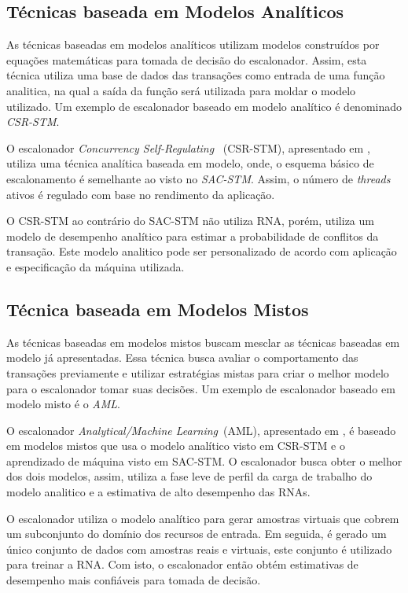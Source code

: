 \documentclass[ti]{texufpel}
\begin{document}
\subsection{Técnicas baseada em Modelos Analíticos}

As técnicas baseadas em modelos analíticos utilizam modelos construídos por equações matemáticas para tomada de decisão do escalonador. Assim, esta técnica utiliza uma base de dados das transações como entrada de uma função analitica, na qual a saída da função será utilizada para moldar o modelo utilizado. Um exemplo de escalonador baseado em modelo  analítico é denominado \emph{CSR-STM}.

O escalonador \emph{Concurrency Self-Regulating }~(CSR-STM), apresentado em \cite{sanzo13}, utiliza uma técnica analítica baseada em modelo, onde, o esquema básico de escalonamento é semelhante ao visto no \emph{SAC-STM}. Assim, o número de \emph{threads} ativos é regulado com base no rendimento da aplicação.

O CSR-STM ao contrário do SAC-STM não utiliza RNA, porém, utiliza um modelo de desempenho analítico para estimar a probabilidade de conflitos da transação. Este modelo analitico pode ser personalizado de acordo com aplicação e especificação da máquina utilizada.

\subsection{Técnica baseada em Modelos Mistos}

As técnicas baseadas em modelos mistos buscam mesclar as técnicas baseadas em modelo já apresentadas. Essa técnica busca avaliar o comportamento das transações previamente e utilizar estratégias mistas para criar o melhor modelo para o escalonador tomar suas decisões. Um exemplo de escalonador baseado em modelo  misto é o \emph{AML}.

O escalonador \emph{Analytical/Machine Learning}~(AML), apresentado em \cite{rughetti14}, é baseado em modelos mistos que usa o modelo analítico visto em CSR-STM e o aprendizado de máquina visto em SAC-STM. O escalonador busca obter o melhor dos dois modelos, assim, utiliza a fase leve de perfil da carga de trabalho do modelo analitico e a estimativa de alto desempenho das RNAs.

O escalonador utiliza o modelo analítico para gerar amostras virtuais que cobrem um subconjunto do domínio dos recursos de entrada. Em seguida, é gerado um único conjunto de dados com amostras reais e virtuais, este conjunto é utilizado para treinar a RNA. Com isto, o escalonador então obtém estimativas de desempenho mais confiáveis para tomada de decisão.
\end{document}
